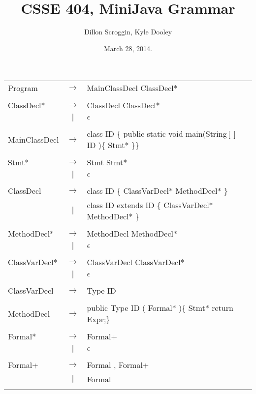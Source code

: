 \documentclass{article}
\author{Dillon Scroggin, Kyle Dooley}
\title{CSSE 404, MiniJava Grammar}
\date{March 28, 2014.}
\begin{document}
\maketitle

\begin{tabular}{ l c l }
	Program & $\rightarrow$ & MainClassDecl ClassDecl* \\
	\\

	ClassDecl* & $\rightarrow$ & ClassDecl ClassDecl* \\
	& $|$ & $\epsilon$\\
	\\

	MainClassDecl & $\rightarrow$ & class ID \{ public static void
main(String$[]$ ID )\{ Stmt* \}\} \\
	\\

	Stmt* & $\rightarrow$ & Stmt Stmt* \\
	&$|$&$\epsilon$ \\
	\\

	ClassDecl & $\rightarrow$ & class ID \{ ClassVarDecl* MethodDecl* \} \\
	& $|$ & class ID extends ID \{ ClassVarDecl* MethodDecl* \} \\
	\\

	MethodDecl* & $\rightarrow$ & MethodDecl MethodDecl* \\
	&$|$&$\epsilon$ \\
	\\
	
	ClassVarDecl* & $\rightarrow$ & ClassVarDecl ClassVarDecl* \\
	&$|$&$\epsilon$ \\
	\\

	ClassVarDecl & $\rightarrow$ & Type ID \\
	\\

	MethodDecl & $\rightarrow$ & public Type ID ( Formal* )\{ Stmt* return Expr;\} \\ 
	\\

	Formal* & $\rightarrow$ & Formal+ \\
	& $|$ & $\epsilon$ \\
	\\

	Formal+ & $\rightarrow$ & Formal , Formal+ \\
  	& $|$ & Formal \\
	\\


\end{tabular}
\end{document}
